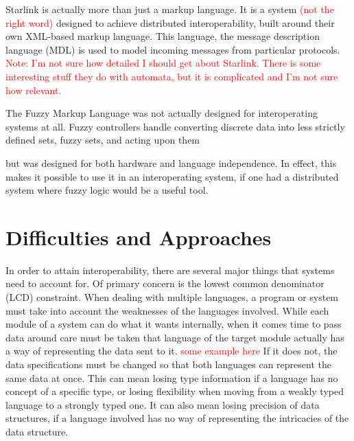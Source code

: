 \documentclass{sig-alternate}
\newcommand{\mycomment}[1]{\textcolor{red}{#1}}
\begin{document}
Starlink \cite{Bromberg:2011} is actually more than just a markup language. It is a system \mycomment{(not the right word)} designed to achieve distributed interoperability, built around their own XML-based markup language. This language, the message description language (MDL) is used to model incoming messages from particular protocols.
\mycomment{Note: I'm not sure how detailed I should get about Starlink. There is some interesting stuff they do with automata, but it is complicated and I'm not sure how relevant.}

The Fuzzy Markup Language was not actually designed for interoperating systems at all. Fuzzy controllers handle converting discrete data into less strictly defined sets, fuzzy sets, and acting upon them 

 but was designed for both hardware and language independence. In effect, this makes it possible to use it in an interoperating system, if one had a distributed system where fuzzy logic would be a useful tool.

\section{Difficulties and Approaches}\label{approaches}
In order to attain interoperability, there are several major things that systems need to account for. Of primary concern is the lowest common denominator (LCD) constraint.
When dealing with multiple languages, a program or system must take into account the weaknesses of the languages involved. While each module of a system can do what it wants internally, when it comes time to pass data around care must be taken that language of the target module actually has a way of representing the data sent to it. \mycomment{some example here}
If it does not, the data specifications must be changed so that both languages can represent the same data at once. This can mean losing type information if a language has no concept of a specific type, or losing flexibility when moving from a weakly typed language to a strongly typed one. It can also mean losing precision of data structures, if a language involved has no way of representing the intricacies of the data structure.
\end{document}
